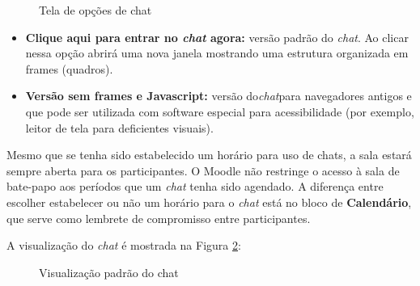 \begin{figure}[htbp]
 \begin{center}
  \caption{Tela de opções de chat}
  \label{fig:cap5_13}
 \end{center}
\end{figure}

\begin{itemize}
 \item \textbf{Clique aqui para entrar no \textit{chat} agora:} versão padrão do \textit{chat}. Ao clicar nessa opção abrirá uma nova janela mostrando uma estrutura organizada em frames (quadros).
 \item \textbf{Versão sem frames e Javascript:} versão do\textit{chat}para navegadores antigos e que pode ser utilizada com software especial para acessibilidade (por exemplo, leitor de tela para deficientes visuais).
\end{itemize}

Mesmo que se tenha sido estabelecido um horário para uso de chats, a sala estará sempre aberta para os participantes. O Moodle não restringe o acesso à sala de bate-papo aos períodos que um \textit{chat} tenha sido agendado. A diferença entre escolher estabelecer ou não um horário para o \textit{chat} está no bloco de \textbf{Calendário}, que serve como lembrete de compromisso entre participantes.

A visualização do  \textit{chat } é mostrada na Figura \ref{fig:cap5_14}:

\begin{figure}[htbp]
 \begin{center}
  \caption{Visualização padrão do chat}
  \label{fig:cap5_14}
 \end{center}
\end{figure}

